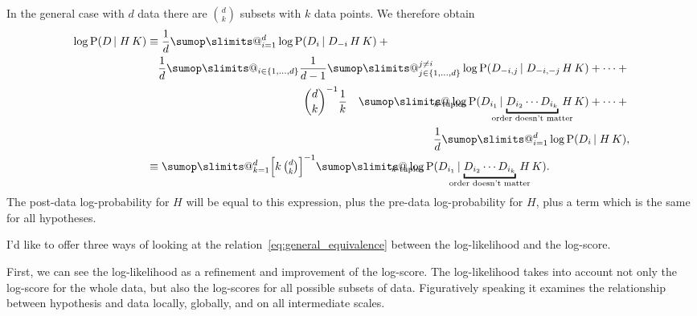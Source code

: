 \documentclass[\ifafour a4paper,12pt,\else a5paper,10pt,\fi%
onecolumn,oneside,article,%
british%
]{memoir}
\makeatletter
\theoremstyle{remark}
\theoremstyle{innote}
\def\sum{\DOTSI\sumop\slimits@}
\DeclarePairedDelimiter\set{\{}{\}}
\newcommand*{\p}{\mathrm{P}}%
\renewcommand*{\|}[1][]{\nonscript\,#1\vert\nonscript\;\mathopen{}}
\newcommand*{\yK}{K}
\makeatother
\begin{document}
In the general case with $d$ data there are $\binom{d}{k}$ subsets with $k$
data points. We therefore obtain
\begin{equation}
  \label{eq:general_equivalence}
  \begin{aligned}
  \log\p(D \| H \, \yK) &\equiv
  \frac{1}{d} \sum_{i=1}^{d} \log\p(D_{i} \| D_{-i} \, H \, \yK)
+{}\\
  &\quad
    \begin{aligned}
\frac{1}{d} \sum_{i\in\set{1,\dotsc,d}} \frac{1}{d-1} \sum_{j\in\set{1,\dotsc,d}}^{j\ne i}  \log\p(D_{-i,j} \| D_{-i,-j} \, H \, \yK)
  +  \dotsb +{}&\\[0.5\jot]
  \binom{d}{k}^{-1}\frac{1}{k}\quad
  \sum_{\mathclap{\text{$k$-tuples}}}   \log\p(D_{i_{1}} \| \underbracket{D_{i_{2}} \dotsm D_{i_{k}}}_{\mathclap{\text{order doesn't matter}}} \, H \, \yK)
  + \dotsb +{}&\\[0.5\jot]
  \frac{1}{d} \sum_{i=1}^{d} \log\p(D_{i} \| H \, \yK),&
    \end{aligned}
\\
                       &\equiv \sum_{k=1}^{d}
  \Bigl[k\,\tbinom{d}{k}\Bigr]^{-1}
  \sum_{\mathclap{\text{$k$-tuples}}}   \log\p(D_{i_{1}} \| \underbracket{D_{i_{2}} \dotsm D_{i_{k}}}_{\mathclap{\text{order doesn't matter}}} \, H \, \yK).
  \end{aligned}
\end{equation}
The post-data log-probability for $H$ will be equal to this expression,
plus the pre-data log-probability for $H$, plus a term which is the same for
all hypotheses.

I'd like to offer three ways of looking at the
relation~\eqref{eq:general_equivalence} between the log-likelihood and the
log-score.

First, we can see the log-likelihood as a refinement and improvement of the
log-score. The log-likelihood takes into account not only the log-score for
the whole data, but also the log-scores for all possible subsets of data.
Figuratively speaking it examines the relationship between hypothesis and
data locally, globally, and on all intermediate scales.
\end{document}
